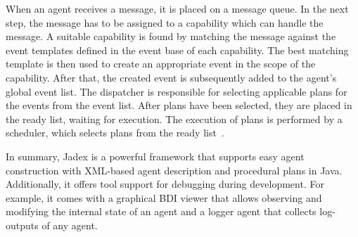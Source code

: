 When an agent receives a message, it is placed on a message queue.
In the next step, the message has to be assigned to a capability which can handle the message.
A suitable capability is found by matching the message against the event templates defined in the event base of each capability.
The best matching template is then used to create an appropriate event in the scope of the capability.
After that, the created event is subsequently added to the agent's global event list.
The dispatcher is responsible for selecting applicable plans for the events from the event list.
After plans have been selected, they are placed in the ready list, waiting for execution.
The execution of plans is performed by a scheduler, which selects plans from the ready list~\cite{pokahr_jadex_2005}.

In summary, Jadex is a powerful framework that supports easy agent construction with XML-based agent description and procedural plans in Java.
Additionally, it offers tool support for debugging during development.
For example, it comes with a graphical BDI viewer that allows observing and modifying the internal state of an agent and a logger agent that collects log-outputs of any agent.
